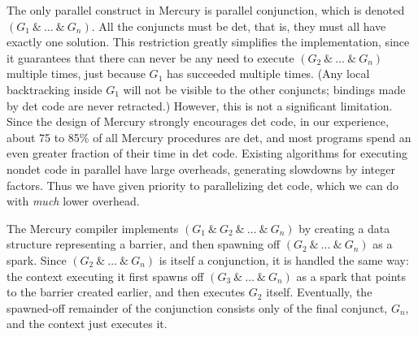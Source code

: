 The only parallel construct in Mercury is parallel conjunction,
which is denoted $(G_1~\&~\ldots~\&~G_n)$.
All the conjuncts must be det,
that is, they must all have exactly one solution.
This restriction greatly simplifies the implementation,
since it guarantees that there can never be any need
to execute $(G_2~\&~\ldots~\&~G_n)$ multiple times,
just because $G_1$ has succeeded multiple times.
(Any local backtracking inside $G_1$ will not be visible to the other conjuncts;
bindings made by det code are never retracted.)
However, this is not a significant limitation.
Since the design of Mercury strongly encourages det code,
in our experience, about 75 to 85\% of all Mercury procedures are det,
and most programs spend an even greater fraction of their time in det code.
Existing algorithms for executing nondet code in parallel
have large overheads, generating slowdowns by integer factors.
Thus we have given priority to parallelizing det code,
which we can do with \emph{much} lower overhead.

The Mercury compiler implements $(G_1~\&~G_2~\&~\ldots~\&~G_n)$
by creating a data structure representing a barrier,
and then spawning off $(G_2~\&~\ldots~\&~G_n)$ as a spark.
Since $(G_2~\&~\ldots~\&~G_n)$ is itself a conjunction,
it is handled the same way:
the context executing it
first spawns off $(G_3~\&~\ldots~\&~G_n)$ as a spark that points to the barrier
created earlier,
and then executes $G_2$ itself.
Eventually, the spawned-off remainder of the conjunction
consists only of the final conjunct, $G_n$,
and the context just executes it.


